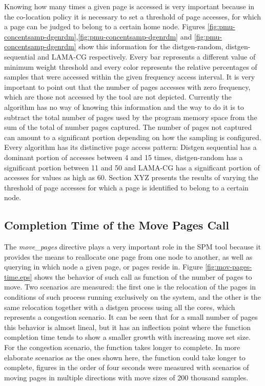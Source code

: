 Knowing how many times a given page is accessed is very important because in the co-location policy it is necessary to set a threshold of page accesses, for which a page can be judged to belong to a certain home node. Figures \ref{fig:pmu-concentsamp-dgenrdm},\ref{fig:pmu-concentsamp-dgenrdm} and \ref{fig:pmu-concentsamp-dgenrdm} show this information for the distgen-random, distgen-sequential and LAMA-CG respectively. Every bar represents a different value of minimum weight threshold and every color represents the relative percentages of samples that were accessed within the given frequency access interval. It is very important to point out that the number of pages accesses with zero frequency, which are those not accessed by the tool are not depicted. Currently the algorithm has no way of knowing this information and the way to do it is to subtract the total number of pages used by the program memory space from the sum of the total of number pages captured. The number of pages not captured can amount to a significant portion depending on how the sampling is configured.
Every algorithm has its distinctive page access pattern: Distgen sequential has a dominant portion of accesses between 4 and 15 times, distgen-random has a significant portion between 11 and 50 and LAMA-CG has a significant portion of accesses for values as high as 60. Section XYZ presents the results of varying the threshold of page accesses for which a page is identified to belong to a certain node.



\subsection{Completion Time of the Move Pages Call}\label{subsection:pmu-movpatime}


The \textit{move\_pages} directive plays a very important role in the SPM tool because it provides the means to reallocate one page from one node to another, as well as querying in which node a given page, or pages reside in. Figure \ref{fig:mov-pages-time.eps} shows the behavior of such call as function of the number of pages to move. Two scenarios are measured: the first one is the relocation of the pages in conditions of such process running exclusively on the system, and the other is the same relocation together with a distgen process using all the cores, which represents a congestion scenario. It can be seen that for a small number of pages this behavior is almost lineal, but it has an inflection point where the function completion time tends to show a smaller growth with increasing move set size. For the congestion scenario, the function takes longer to complete. In more elaborate scenarios as the ones shown here, the function could take longer to complete, figures in the order of four seconds were measured with scenarios of moving pages in multiple directions with move sizes of 200 thousand samples.


